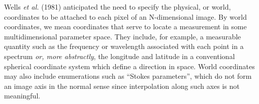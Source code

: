 

Wells {\it et al.} (1981) anticipated the need to specify the
physical, or world, coordinates to be attached to each pixel of an
N-dimensional image.  By world coordinates, we mean coordinates that
serve to locate a measurement in some multidimensional parameter
space.  They include, for example, a measurable quantity such as the
frequency or wavelength associated with each point in a spectrum {\it
or, more abstractly}, the longitude and latitude in a conventional
spherical coordinate system which define a direction in space.  World
coordinates may also include enumerations such as ``Stokes
parameters'', which do not form an image axis in the normal sense
since interpolation along such axes is not meaningful.

\bigskip



\bye

